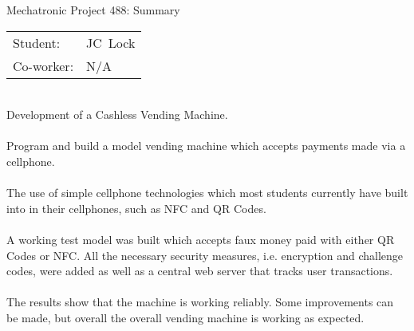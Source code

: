 
\begin{Summary}{Mechatronic Project 488: Summary}

   \noindent
   \begin{tabular}{@{}ll@{}}
      \textsf{Student:}  &  JC\ Lock\\
      \textsf{Co-worker:} & N/A
   \end{tabular}

\begin{SumTable}
 \hline%
 \\
 \hline%
 Development of a Cashless Vending Machine.
 \\

 \hline%
 \\
 \hline%
 Program and build a model vending machine which accepts payments made via a cellphone.
 \\

 \hline%
 \\
 \hline%
 The use of simple cellphone technologies which most students currently have built
 into in their cellphones, such as NFC and QR Codes.
 \\
   
 \hline%
 \\
 \hline%
 A working test model was built which accepts faux money paid with either QR Codes or NFC. All
 the necessary security measures, i.e. encryption and challenge codes, were added as well as a
 central web server that tracks user transactions.
 \\

 \hline%
 \\
 \hline%
 The results show that the machine is working reliably. Some improvements can be made, but
 overall the overall vending machine is working as expected.
 \\


\end{SumTable}
\end{Summary}
